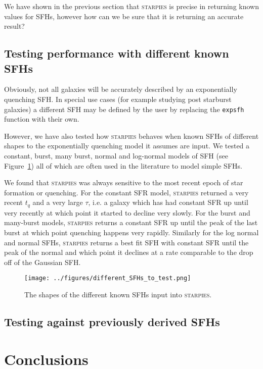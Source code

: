 \documentclass[useAMS,usenatbib]{mn2e}
\begin{document}
We have shown in the previous section that \textsc{starpies} is precise in returning known values for SFHs, however how can we be sure that it is returning an accurate result? 


\subsection{Testing performance with different known SFHs}

Obviously, not all galaxies will be accurately described by an exponentially quenching SFH. In special use cases (for example studying post starburst galaxies) a different SFH may be defined by the user by replacing the \texttt{expsfh} function with their own. 

However, we have also tested how \textsc{starpies} behaves when known SFHs of different shapes to the exponentially quenching model it assumes are input. We tested a constant, burst, many burst, normal and log-normal models of SFH (see Figure~\ref{fig:differentSFHs}) all of which are often used in the literature to model simple SFHs. 

We found that \textsc{starpies} was always sensitive to the most recent epoch of star formation or quenching. For the constant SFR model, \textsc{starpies} returned a very recent $t_q$ and a very large $\tau$, i.e. a galaxy which has had constant SFR up until very recently at which point it started to decline very slowly. For the burst and many-burst models, \textsc{starpies} returns a constant SFR up until the peak of the last burst at which point quenching happens very rapidly. Similarly for the log normal and normal SFHs, \textsc{starpies} returns a best fit SFH with constant SFR until the peak of the normal and which point it declines at a rate comparable to the drop off of the Gaussian SFH. 

\begin{figure}
\centering
\texttt{[image: ../figures/different\_SFHs\_to\_test.png]}
\caption{The shapes of the different known SFHs input into \textsc{starpies}.}
\label{fig:differentSFHs}
\end{figure}

\subsection{Testing against previously derived SFHs}

\section{Conclusions}


  
\end{document}
